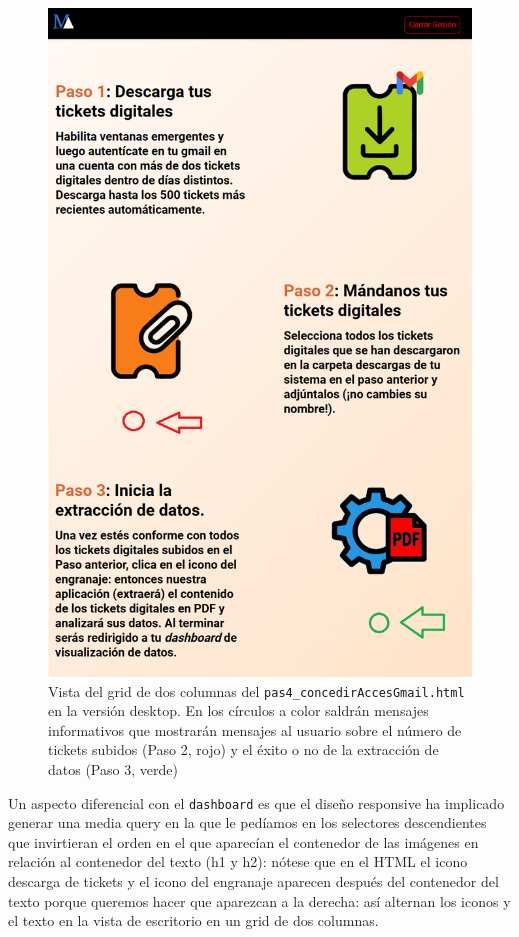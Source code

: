 \documentclass[a4paper,12pt]{report}
\begin{document}
	\FloatBarrier
	\begin{figure}[H]
		\centering
		\caption{Vista del grid de dos columnas del \texttt{pas4\_concedirAccesGmail.html} en la versión desktop. En los círculos a color saldrán mensajes informativos que mostrarán mensajes al usuario sobre el número de tickets subidos (Paso 2, rojo) y el éxito o no de la extracción de datos (Paso 3, verde)}
		\includegraphics[width=.95\linewidth]{img/pas4Grid2cols}

		\label{fig:pas4grid2cols}
	\end{figure}
	\FloatBarrier
	
	Un aspecto diferencial con el \texttt{dashboard} es que el diseño responsive ha implicado generar una media query en la que le pedíamos en los selectores descendientes que invirtieran el orden en el que aparecían el contenedor de las imágenes en relación al contenedor del texto (h1 y h2): nótese que en el HTML el icono descarga de tickets y el icono del engranaje aparecen después del contenedor del texto porque queremos hacer que aparezcan a la derecha: así alternan los iconos y el texto en la vista de escritorio en un grid de dos columnas. 
	
\end{document}
